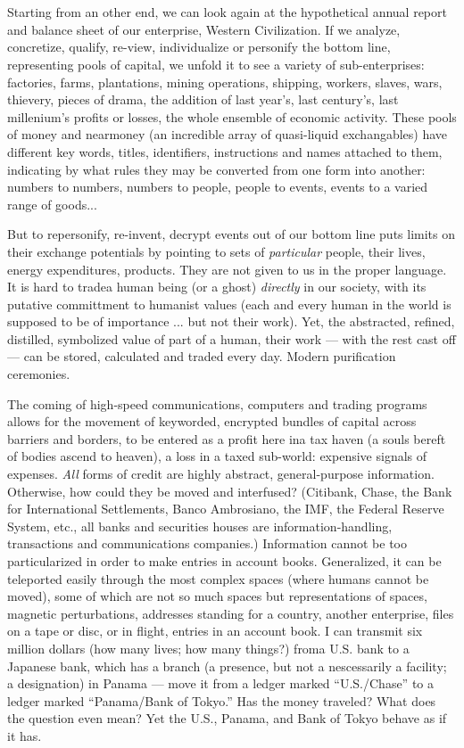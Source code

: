 \chapter{}

Starting from an other end, we can look again at the hypothetical annual report and
balance sheet of our enterprise, Western Civilization. If we analyze, concretize, qualify, re-view, individualize or personify the
bottom line, representing pools of capital, we unfold it to see a variety of sub-enterprises: factories, farms, plantations, mining
operations, shipping, workers, slaves, wars, thievery, pieces of drama, the addition of last
year's, last century's, last millenium's profits or losses, the whole ensemble of economic
activity. These pools of money and nearmoney (an incredible array of quasi-liquid
exchangables) have different key words, titles, identifiers, instructions and names attached to them, indicating by what rules
they may be converted from one form into another: numbers
to numbers, numbers to people, people to events, events to a varied range of goods...

But to repersonify, re-invent, decrypt
events out of our bottom line puts limits on
their exchange potentials by pointing to sets
of \emph{particular} people, their lives, energy expenditures, products. They are not given to
us in the proper language. It is hard to tradea
human being (or a ghost) \emph{directly} in our
society, with its putative committment to
humanist values (each and every human in
the world is supposed to be of importance
... but not their work). Yet, the abstracted,
refined, distilled, symbolized value of part
of a human, their work --- with the rest cast
off --- can be stored, calculated and traded
every day. Modern purification ceremonies.

The coming of high-speed communications, computers and trading programs allows for the movement of keyworded, encrypted bundles of capital across barriers
and borders, to be entered as a profit here ina
tax haven (a souls bereft of bodies ascend to
heaven), a loss in a taxed sub-world: expensive signals of expenses. \emph{All} forms of credit
are highly abstract, general-purpose information. Otherwise, how could they be moved
and interfused? (Citibank, Chase, the Bank
for International Settlements, Banco Ambrosiano, the IMF, the Federal Reserve System,
etc., all banks and securities houses are
information-handling, transactions and communications companies.) Information cannot be too particularized in order to make
entries in account books. Generalized, it can
be teleported easily through the most complex
spaces (where humans cannot be moved),
some of which are not so much spaces but
representations of spaces, magnetic perturbations, addresses standing for a country,
another enterprise, files on a tape or disc, or
in flight, entries in an account book. I can
transmit six million dollars (how many
lives; how many things?) froma U.S. bank to
a Japanese bank, which has a branch (a
presence, but not a nescessarily a facility; a
designation) in Panama --- move it from a
ledger marked \enquote{U.S.\slash Chase} to a ledger
marked \enquote{Panama\slash Bank of Tokyo.} Has the
money traveled? What does the question
even mean? Yet the U.S., Panama, and Bank
of Tokyo behave as if it has.

